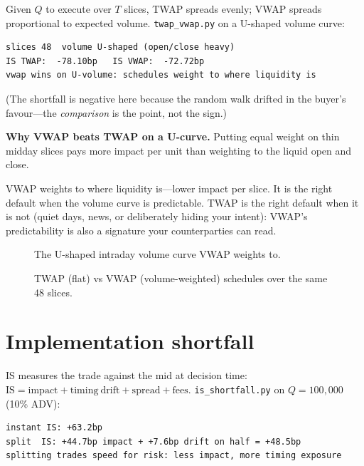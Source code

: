 Given $Q$ to execute over $T$ slices, TWAP spreads evenly; VWAP spreads proportional to
expected volume. \texttt{twap\_vwap.py} on a U-shaped volume curve:
\begin{lstlisting}[numbers=none]
slices 48  volume U-shaped (open/close heavy)
IS TWAP:  -78.10bp   IS VWAP:  -72.72bp
vwap wins on U-volume: schedules weight to where liquidity is
\end{lstlisting}
(The shortfall is negative here because the random walk drifted in the buyer's favour---the
\emph{comparison} is the point, not the sign.)

\begin{example}\label{ex:vwap}
\textbf{Why VWAP beats TWAP on a U-curve.} Putting equal weight on thin midday slices pays
more impact per unit than weighting to the liquid open and close.
\begin{solution}
VWAP weights to where liquidity is---lower impact per slice. It is the right default
when the volume curve is predictable. TWAP is the right default when it is not (quiet
days, news, or deliberately hiding your intent): VWAP's predictability is also a
signature your counterparties can read.
\end{solution}
\end{example}

\begin{figure}[htbp]\centering

\caption{The U-shaped intraday volume curve VWAP weights to.}
\label{fig:volume}
\end{figure}

\begin{figure}[htbp]\centering

\caption{TWAP (flat) vs VWAP (volume-weighted) schedules over the same 48 slices.}
\label{fig:sched}
\end{figure}

\section{Implementation shortfall}\label{sec:is}

IS measures the trade against the mid at decision time:
$\mathrm{IS}=\mathrm{impact}+\mathrm{timing\ drift}+\mathrm{spread}+\mathrm{fees}$.
\texttt{is\_shortfall.py} on $Q=100{,}000$ (10\% ADV):
\begin{lstlisting}[numbers=none]
instant IS: +63.2bp
split  IS: +44.7bp impact + +7.6bp drift on half = +48.5bp
splitting trades speed for risk: less impact, more timing exposure
\end{lstlisting}


